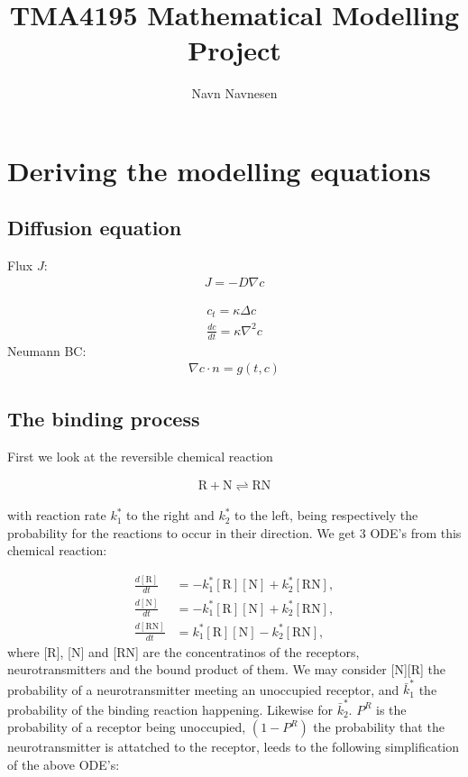 \documentclass[11pt, a4paper]{article}\usepackage[]{graphicx}\usepackage[]{color}
\author{Navn Navnesen}
\title{{\bf TMA4195} Mathematical Modelling Project}
\begin{document}
\maketitle

\section*{Deriving the modelling equations}
\subsection*{Diffusion equation}
Flux $J$:
\begin{align*}
J = -D\nabla c
\end{align*}


\begin{align*}
c_t = \kappa \Delta c\\
\frac{dc}{dt} = \kappa \nabla^2 c
\end{align*}
Neumann BC:
\begin{align*}
\nabla c \cdot n = g(t,c)
\end{align*}

\subsection*{The binding process}

First we look at the reversible chemical reaction

\begin{align*}
\text{R} + \text{N} \rightleftharpoons \text{RN}
\end{align*}

with reaction rate $k_1^*$ to the right and $k_2^*$ to the left, being respectively the probability for the reactions to occur in their direction. 
We get 3 ODE's from this chemical reaction:

\begin{align*}
\frac{d[\text{R}]}{dt} &= -k_1^*[\text{R}][\text{N}] + k_2^*[\text{RN}],\\
\frac{d[\text{N}]}{dt} &= -k_1^*[\text{R}][\text{N}] + k_2^*[\text{RN}],\\
\frac{d[\text{RN}]}{dt} &= k_1^*[\text{R}][\text{N}] - k_2^*[\text{RN}],
\end{align*}
where [R], [N] and [RN] are the concentratinos of the receptors, neurotransmitters and the bound product of them.
We may consider [N][R] the probability of a neurotransmitter meeting an unoccupied receptor, and $\bar{k}_1^*$ the probability of the binding reaction happening. Likewise for $\bar{k}_2^*$. $P^R$ is the probability of a receptor being unoccupied, $(1-P^R)$ the probability that the neurotransmitter is attatched to the receptor, leeds to the following simplification of the above ODE's:
\end{document}
